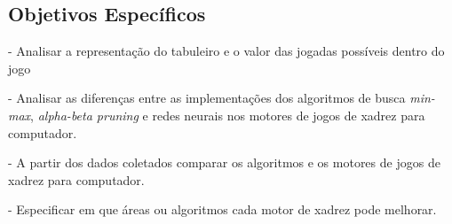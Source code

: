 \subsection{Objetivos Específicos}
- Analisar a representação do tabuleiro e o valor das jogadas possíveis dentro do jogo

- Analisar as diferenças entre as implementações dos algoritmos de busca \textit{min-max}, \textit{alpha-beta pruning} e
redes neurais nos motores de jogos de xadrez para computador.

- A partir dos dados coletados comparar os algoritmos e os motores de jogos de xadrez para computador.

- Especificar  em que áreas ou algoritmos cada motor de xadrez pode melhorar.



